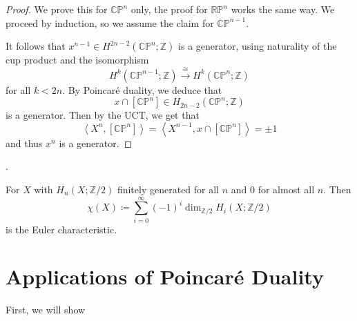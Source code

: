\begin{proof}
  We prove this for $\mathbb{C}\mathbb{P}^n$ only,
  the proof for $\mathbb{R}\mathbb{P}^n$ works the same way.
  We proceed by induction, so we assume the claim for $\mathbb{C}\mathbb{P}^{n-1}$.

  It follows that $x^{n-1} \in H^{2n-2}(\mathbb{C}\mathbb{P}^n ;\mathbb{Z})$ 
  is a generator, using naturality of the cup product and the
  isomorphism
  \[
    H^k(\mathbb{C}\mathbb{P}^{n-1};\mathbb{Z})
    \xrightarrow{\cong}
    H^k(\mathbb{C}\mathbb{P}^n;\mathbb{Z})
  \] 
  for all $k<2n$. 
  By Poincaré duality, we deduce that
  \[
    x \cap [\mathbb{C}\mathbb{P}^n] \in H_{2n-2}(\mathbb{C}\mathbb{P}^n;\mathbb{Z})
  \]
  is a generator.
  Then by the UCT, we get that
  \[
    \left< X^n, [\mathbb{C}\mathbb{P}^n] \right>
    =
    \left< X^{n-1}, x \cap [\mathbb{C}\mathbb{P}^n] \right>
    =
    \pm 1
  \]
  and thus $x^n$ is a generator.
\end{proof}

.

\begin{definition}
  For $X$ with $H_n(X;\mathbb{Z}/2)$ finitely generated for all $n$
  and  $0$ for almost all $n$.
  Then
   \[
    \chi(X) \coloneqq \sum_{i=0}^{\infty} (-1)^i \dim_{\mathbb{Z}/2} H_i(X;\mathbb{Z}/2)
  \]
  is the Euler characteristic.
\end{definition}



\section{Applications of Poincaré Duality}

First, we will show
